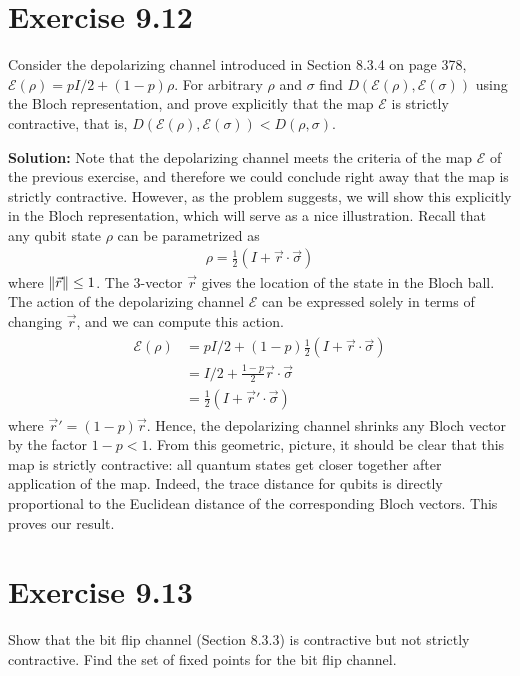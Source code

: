 \documentclass{book}
\newcommand{\mc}[1]{\mathcal{#1}}
\begin{document}
\section*{Exercise 9.12}
    Consider the depolarizing channel introduced in Section 8.3.4 on page 378, $\mc{E}(\rho) = pI/2 + (1 - p)\rho$. For arbitrary $\rho$ and $\sigma$ find $D(\mc{E}(\rho), \mc{E}(\sigma))$ using the Bloch representation, and prove explicitly that the map $\mc{E}$ is strictly contractive, that is, $D(\mc{E}(\rho), \mc{E}(\sigma)) < D(\rho, \sigma)$.
    
    \textbf{Solution:} Note that the depolarizing channel meets the criteria of the map $\mc{E}$ of the previous exercise, and therefore we could conclude right away that the map is strictly contractive. However, as the problem suggests, we will show this explicitly in the Bloch representation, which will serve as a nice illustration. Recall that any qubit state $\rho$ can be parametrized as 
    \begin{align}
        \rho = \frac{1}{2}(I+\Vec{r}\cdot\vec{\sigma})
    \end{align}
    where $\norm{\vec{r}} \leq 1$. The 3-vector $\vec{r}$ gives the location of the state in the Bloch ball. The action of the depolarizing channel $\mc{E}$ can be expressed solely in terms of changing $\vec{r}$, and we can compute this action.
    \begin{align}
    \begin{aligned}
        \mc{E}(\rho) &= pI/2 + (1-p)\frac{1}{2}(I+\vec{r}\cdot\vec{\sigma}) \\
        &= I/2 + \frac{1-p}{2}\vec{r}\cdot\vec{\sigma}\\
        &= \frac{1}{2}(I+\vec{r}'\cdot\vec{\sigma})
    \end{aligned}
    \end{align}
    where $\vec{r}' = (1-p) \vec{r}$. Hence, the depolarizing channel shrinks any Bloch vector by the factor $1-p<1$. From this geometric, picture, it should be clear that this map is strictly contractive: all quantum states get closer together after application of the map. Indeed, the trace distance for qubits is directly proportional to the Euclidean distance of the corresponding Bloch vectors. This proves our result. 
    
\section*{Exercise 9.13}
    Show that the bit flip channel (Section 8.3.3) is contractive but not strictly contractive. Find the set of fixed points for the bit flip channel.
    
\end{document}
